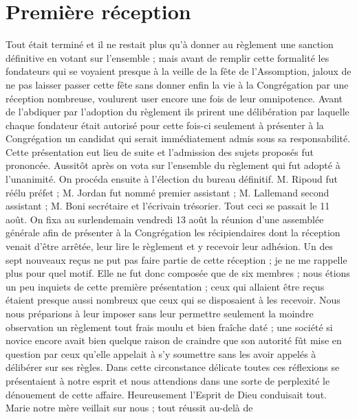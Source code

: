\section*{Première réception}
Tout était terminé et il ne restait plus qu'à donner au règlement une sanction définitive en votant sur l'ensemble ; mais avant de remplir cette formalité les fondateurs qui se voyaient presque à la veille de la fête de l'Assomption, jaloux de ne pas laisser passer cette fête sans donner enfin la vie à la Congrégation par une réception nombreuse, voulurent user encore une fois de leur omnipotence. Avant de l'abdiquer par l'adoption du règlement ils prirent une délibération par laquelle chaque fondateur était autorisé pour cette fois-ci seulement à présenter à la Congrégation un candidat qui serait
immédiatement admis sous sa responsabilité. Cette présentation eut lieu de suite et l'admission des sujets proposés fut prononcée. Aussitôt après on vota sur l'ensemble du règlement qui fut adopté à l'unanimité. On procéda ensuite à l'élection du bureau définitif. M. Ripoud fut réélu préfet ; M. Jordan fut nommé premier assistant ; M. Lallemand second assistant ; M. Boni secrétaire et l'écrivain trésorier. Tout ceci se passait le 11 août. On fixa au surlendemain vendredi 13 août la réunion d'une assemblée générale afin de présenter à la Congrégation les récipiendaires dont la réception venait d'être arrêtée, leur lire le règlement et y recevoir leur adhésion. Un des sept nouveaux reçus ne put pas faire partie de cette réception ; je ne me rappelle plus pour quel motif. Elle ne fut donc composée que de six membres ; nous étions un peu inquiets de cette première présentation ; ceux qui allaient être reçus étaient presque aussi nombreux que ceux qui se disposaient à les recevoir. Nous nous préparions à leur imposer sans leur permettre seulement la moindre observation un règlement tout frais moulu et bien fraîche daté ; une société si novice encore avait bien quelque raison de craindre que son autorité fût mise en question par ceux qu'elle appelait à s'y soumettre sans les avoir appelés à délibérer sur ses règles. Dans cette circonstance délicate toutes ces réflexions se présentaient à notre esprit et nous attendions dans une sorte de perplexité le dénouement de cette affaire. Heureusement l'Esprit de Dieu conduisait tout. Marie notre mère veillait sur nous ; tout réussit au-delà de
